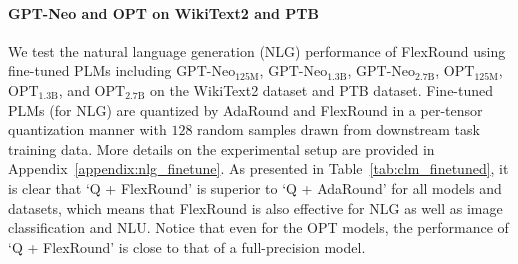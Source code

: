 \documentclass{article}
\theoremstyle{plain}
\theoremstyle{definition}
\theoremstyle{remark}
\begin{document}
\paragraph{GPT-Neo and OPT on WikiText2 and PTB}\label{subsec:nlg}
We test the natural language generation (NLG) performance of FlexRound using fine-tuned PLMs including $\text{GPT-Neo}_{125\text{M}}$, $\text{GPT-Neo}_{1.3\text{B}}$, $\text{GPT-Neo}_{2.7\text{B}}$, $\text{OPT}_{125\text{M}}$, $\text{OPT}_{1.3\text{B}}$, and $\text{OPT}_{2.7\text{B}}$ on the WikiText2 dataset and PTB dataset. Fine-tuned PLMs (for NLG) are quantized by AdaRound and FlexRound in a per-tensor quantization manner with $128$ random samples drawn from downstream task training data.
More details on the experimental setup are provided in Appendix~\ref{appendix:nlg_finetune}.
As presented in Table~\ref{tab:clm_finetuned}, it is clear that `Q + FlexRound' is superior to `Q + AdaRound' for all models and datasets, which means that FlexRound is also effective for NLG as well as image classification and NLU. Notice that even for the OPT models, the performance of `Q + FlexRound' is close to that of a full-precision model.
\end{document}
